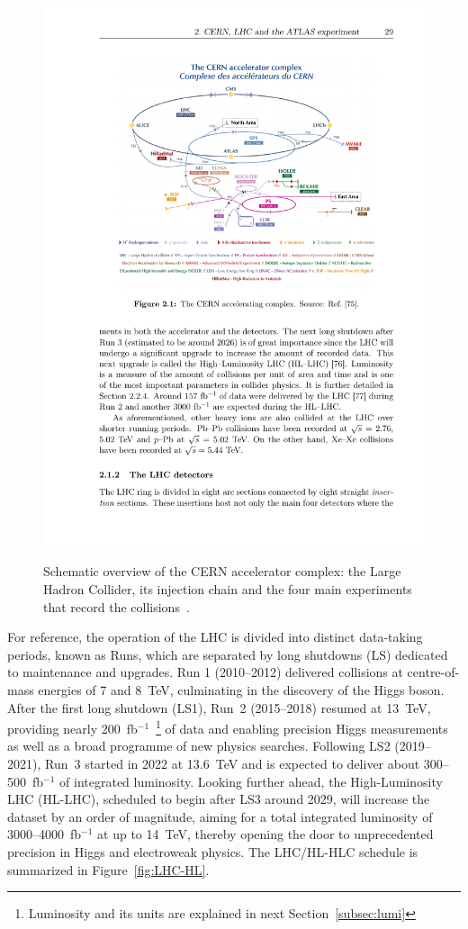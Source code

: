 \begin{figure}[htbp]
    \centering
    \includegraphics[width=1\linewidth]{images/CCC-v2022}\\
    \caption{Schematic overview of the CERN accelerator complex: the Large Hadron Collider, its injection chain and the four main experiments that record the collisions~\cite{Lopienska:2800984}.}
    \label{LHC:chain}
\end{figure}

For reference, the operation of the LHC is divided into distinct data-taking periods, known as Runs, which are separated by long shutdowns (LS) dedicated to maintenance and upgrades. Run 1 (2010--2012) delivered collisions at centre-of-mass energies of 7 and 8~TeV, culminating in the discovery of the Higgs boson. After the first long shutdown (LS1), Run~2 (2015--2018) resumed at 13~TeV, providing nearly 200~fb$^{-1}$~\footnote{Luminosity and its units are explained in next Section~\ref{subsec:lumi}} of data and enabling precision Higgs measurements as well as a broad programme of new physics searches. Following LS2 (2019--2021), Run~3 started in 2022 at 13.6~TeV and is expected to deliver about 300--500~fb$^{-1}$ of integrated luminosity. Looking further ahead, the High-Luminosity LHC (HL-LHC), scheduled to begin after LS3 around 2029, will increase the dataset by an order of magnitude, aiming for a total integrated luminosity of 3000--4000~fb$^{-1}$ at up to 14~TeV, thereby opening the door to unprecedented precision in Higgs and electroweak physics. The LHC/HL-HLC schedule is summarized in Figure~\ref{fig:LHC-HL}.

